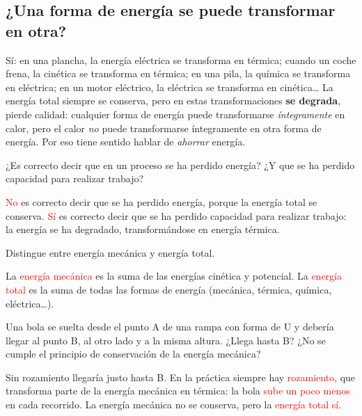 \subsection{¿Una forma de energía se puede transformar en otra?}

Sí: en una plancha, la energía eléctrica se transforma en térmica; cuando un coche frena, la cinética se transforma en térmica; en una pila, la química se transforma en eléctrica; en un motor eléctrico, la eléctrica se transforma en cinética\ldots{} La energía total siempre se conserva, pero en estas transformaciones \textbf{se degrada}, pierde calidad: cualquier forma de energía puede transformarse \emph{íntegramente} en calor, pero el calor \emph{no} puede transformarse íntegramente en otra forma de energía. Por eso tiene sentido hablar de \emph{ahorrar} energía.

\begin{exercise}
    ¿Es correcto decir que en un proceso se ha perdido energía? ¿Y que se ha perdido capacidad para realizar trabajo?
    \begin{solu}
        \textcolor{red}{No} es correcto decir que se ha perdido energía, porque la energía total se conserva. \textcolor{red}{Sí} es correcto decir que se ha perdido capacidad para realizar trabajo: la energía se ha degradado, transformándose en energía térmica.
    \end{solu}
\end{exercise}

\begin{exercise}
    Distingue entre energía mecánica y energía total.
    \begin{solu}
        La \textcolor{red}{energía mecánica} es la suma de las energías cinética y potencial. La \textcolor{red}{energía total} es la suma de todas las formas de energía (mecánica, térmica, química, eléctrica\ldots).
    \end{solu}
\end{exercise}

\begin{exercise}
    Una bola se suelta desde el punto A de una rampa con forma de U y debería llegar al punto B, al otro lado y a la misma altura. ¿Llega hasta B? ¿No se cumple el principio de conservación de la energía mecánica?
    \begin{solu}
        Sin rozamiento llegaría justo hasta B. En la práctica siempre hay \textcolor{red}{rozamiento}, que transforma parte de la energía mecánica en térmica: la bola \textcolor{red}{sube un poco menos} en cada recorrido. La energía mecánica no se conserva, pero la \textcolor{red}{energía total sí}.
    \end{solu}
\end{exercise}

